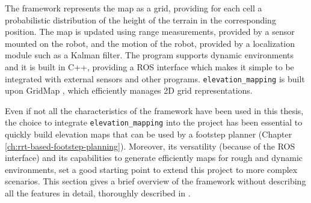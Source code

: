 The framework represents the map as a grid, providing for each cell a 
probabilistic distribution of the height of the terrain in the 
corresponding position. The map is updated using range measurements, provided 
by a sensor mounted on the robot, and the motion of the robot,
provided by a localization module such as a Kalman filter.
The program supports dynamic environments and it is built in C++, providing 
a ROS \cite{ros-melodic} interface which makes it simple to be integrated with
external sensors and other programs. \texttt{elevation\_mapping} is built 
upon GridMap \cite{Fankhauser2016GridMapLibrary}, which efficiently manages 
2D grid representations.

Even if not all the characteristics of the framework have been used in this 
thesis, the choice to integrate \texttt{elevation\_mapping} into the project 
has been essential to quickly build elevation maps that can be used by a
footstep planner (Chapter \ref{ch:rrt-based-footstep-planning}). Moreover, its 
versatility (because of the ROS interface) and its capabilities to generate 
efficiently maps for rough and dynamic environments, set a good starting point 
to extend this project to more complex scenarios. This section gives a brief 
overview of the framework without describing all the features in detail,
thoroughly described in \cite{Fankhauser2018ProbabilisticTerrainMapping}.

